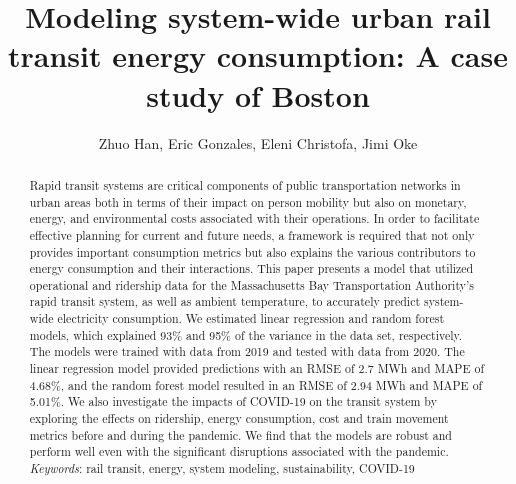 \documentclass[times]{TRR}
\begin{document}

\title{Modeling system-wide urban rail transit energy consumption: A case study of Boston}

\author{Zhuo Han, Eric Gonzales, Eleni Christofa, Jimi Oke}



\begin{abstract}
Rapid transit systems are critical components of public transportation networks in urban areas both in terms of their impact on person mobility but also on monetary, energy, and environmental costs associated with their operations. In order to facilitate effective planning for current and future needs, a framework is required that not only provides important consumption metrics but also explains the various contributors to energy consumption and their interactions. This paper presents a model that utilized operational and ridership data for the Massachusetts Bay Transportation Authority's rapid transit system, as well as  ambient temperature, to accurately predict system-wide electricity consumption. We estimated linear regression and random forest models, which explained 93\% and 95\% of the variance in the data set, respectively.  The models were trained with data from 2019 and tested with data from 2020.  The linear regression model provided predictions with an RMSE of 2.7 MWh and MAPE of 4.68\%, and the random forest model resulted in an RMSE of 2.94 MWh and MAPE of 5.01\%. We also investigate the impacts of COVID-19 on the transit system by exploring the effects on ridership, energy consumption, cost and train movement metrics before and during the pandemic. We find that the models are robust and perform well even with the significant disruptions associated with the  pandemic.\\

\textit{Keywords}: rail transit, energy, system modeling, sustainability, COVID-19
\end{abstract}

\maketitle
\end{document}
